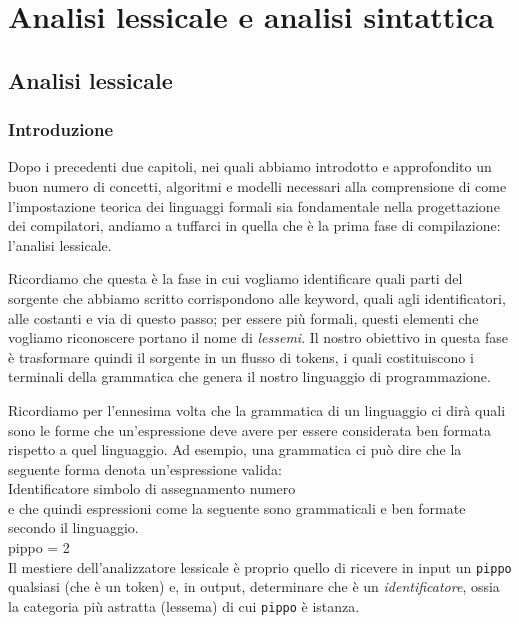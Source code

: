\documentclass[class=book, crop=false, oneside, 12pt]{standalone}
\begin{document}
\chapter{Analisi lessicale e analisi sintattica}

\section{Analisi lessicale}
\subsection{Introduzione}
Dopo i precedenti due capitoli, nei quali abbiamo introdotto e approfondito un buon numero di concetti, algoritmi e modelli necessari alla comprensione di come l'impostazione teorica dei linguaggi formali sia fondamentale nella progettazione dei compilatori, andiamo a tuffarci in quella che è la prima fase di compilazione: l'analisi lessicale.


Ricordiamo che questa è la fase in cui vogliamo identificare quali parti del sorgente che abbiamo scritto corrispondono alle keyword, quali agli identificatori, alle costanti e via di questo passo; per essere più formali, questi elementi che vogliamo riconoscere portano il nome di \emph{lessemi}. 
Il nostro obiettivo in questa fase è trasformare quindi il sorgente in un flusso di tokens, i quali costituiscono i terminali della grammatica che genera il nostro linguaggio di programmazione.

Ricordiamo per l'ennesima volta che la grammatica di un linguaggio ci dirà quali sono le forme che un'espressione deve avere per essere considerata ben formata rispetto a quel linguaggio. Ad esempio, una grammatica ci può dire che la seguente forma denota un'espressione valida:\\
Identificatore      simbolo di assegnamento    numero\\
e che quindi espressioni come la seguente sono grammaticali e ben formate secondo il linguaggio.\\
pippo = 2\\
Il mestiere dell'analizzatore lessicale è proprio quello di ricevere in input un \texttt{pippo} qualsiasi (che è un token) e, in output, determinare che è un \emph{identificatore}, ossia la categoria più astratta (lessema) di cui \texttt{pippo} è istanza.

\end{document}
